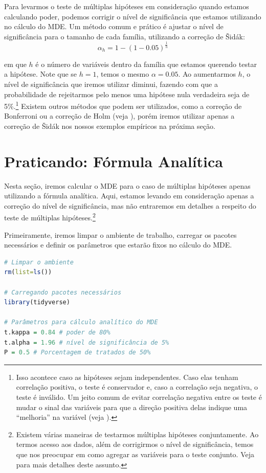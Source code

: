 Para levarmos o teste de múltiplas hipóteses em consideração quando estamos calculando poder, podemos corrigir o nível de significância que estamos utilizando no cálculo do MDE. Um método comum e prático é ajustar o nível de significância para o tamanho de cada família, utilizando a correção de \v{S}idák:
\begin{equation}
    \alpha_h = 1 - (1-0.05)^{\frac{1}{h}}
\end{equation}

\noindent em que $h$ é o número de variáveis dentro da família que estamos querendo testar a hipótese. Note que se $h = 1$, temos o mesmo $\alpha = 0.05$. Ao aumentarmos $h$, o nível de significância que iremos utilizar diminui, fazendo com que a probabilidade de rejeitarmos pelo menos uma hipótese nula verdadeira seja de 5\%.\footnote{Isso acontece caso as hipóteses sejam independentes. Caso elas tenham correlação positiva, o teste é conservador e, caso a correlação seja negativa, o teste é inválido. Um jeito comum de evitar correlação negativa entre os teste é mudar o sinal das variáveis para que a direção positiva delas indique uma ``melhoria'' na variável (veja \citealp{anderson2008}).} Existem outros métodos que podem ser utilizados, como a correção de Bonferroni ou a correção de Holm (veja \citealp{anderson2008}), porém iremos utilizar apenas a correção de \v{S}idák nos nossos exemplos empíricos na próxima seção.

\section{Praticando: Fórmula Analítica}

Nesta seção, iremos calcular o MDE para o caso de múltiplas hipóteses apenas utilizando a fórmula analítica. Aqui, estamos levando em consideração apenas a correção do nível de significância, mas não entraremos em detalhes a respeito do teste de múltiplas hipóteses.\footnote{Existem várias maneiras de testarmos múltiplas hipóteses conjuntamente. Ao termos acesso aos dados, além de corrigirmos o nível de significância, temos que nos preocupar em como agregar as variáveis para o teste conjunto. Veja \cite{anderson2008} para mais detalhes deste assunto.}

Primeiramente, iremos limpar o ambiente de trabalho, carregar os pacotes necessários e definir os parâmetros que estarão fixos no cálculo do MDE.

\begin{boxH}
\begin{lstlisting}[language = R]
# Limpar o ambiente 
rm(list=ls())

# Carregando pacotes necessários
library(tidyverse)

# Parâmetros para cálculo analítico do MDE
t.kappa = 0.84 # poder de 80%
t.alpha = 1.96 # nível de significância de 5%
P = 0.5 # Porcentagem de tratados de 50%
\end{lstlisting}
\end{boxH}


